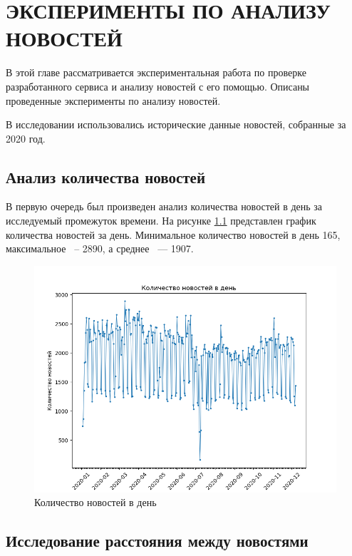 \chapter{ЭКСПЕРИМЕНТЫ ПО АНАЛИЗУ НОВОСТЕЙ}
\label{chap:research}
\aftertitle

В этой главе рассматривается экспериментальная работа по проверке разработанного сервиса и анализу новостей с его помощью. Описаны проведенные эксперименты по анализу новостей.

В исследовании использовались исторические данные новостей, собранные за 2020 год.

\section{Анализ количества новостей}

В первую очередь был произведен анализ количества новостей в день за исследуемый промежуток времени. На рисунке \ref{img:news-count} представлен график количества новостей за день. Минимальное количество новостей в день 165, максимальное ~-- 2890, а среднее ~--- 1907.

\begin{figure}[h]
    \centering
    \includegraphics[width=\linewidth]{images/news-count.png}
    \caption{Количество новостей в день}
    \label{img:news-count}
\end{figure}

\section{Исследование расстояния между новостями}

